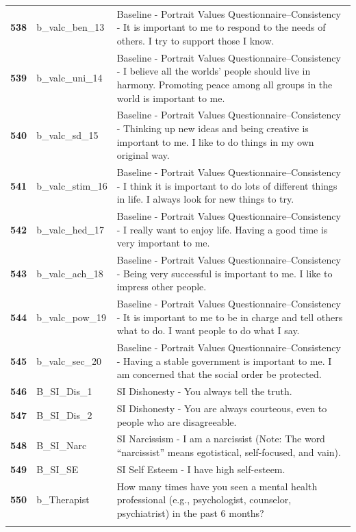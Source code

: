 \documentclass[
  letterpaper,
  DIV=11,
  numbers=noendperiod]{scrartcl}
\begin{document}
\begin{longtable}[t]{>{}cll}
\textbf{538} & b\_valc\_ben\_13 & Baseline - Portrait Values Questionnaire--Consistency - It is important to me to respond to the needs of others. I try to support those I know.\\
\textbf{539} & b\_valc\_uni\_14 & Baseline - Portrait Values Questionnaire--Consistency - I believe all the worlds' people should live in harmony. Promoting peace among all groups in the world is important to me.\\
\textbf{540} & b\_valc\_sd\_15 & Baseline - Portrait Values Questionnaire--Consistency - Thinking up new ideas and being creative is important to me. I like to do things in my own original way.\\
\addlinespace
\textbf{541} & b\_valc\_stim\_16 & Baseline - Portrait Values Questionnaire--Consistency - I think it is important to do lots of different things in life. I always look for new things to try.\\
\textbf{542} & b\_valc\_hed\_17 & Baseline - Portrait Values Questionnaire--Consistency - I really want to enjoy life. Having a good time is very important to me.\\
\textbf{543} & b\_valc\_ach\_18 & Baseline - Portrait Values Questionnaire--Consistency - Being very successful is important to me. I like to impress other people.\\
\textbf{544} & b\_valc\_pow\_19 & Baseline - Portrait Values Questionnaire--Consistency - It is important to me to be in charge and tell others what to do. I want people to do what I say.\\
\textbf{545} & b\_valc\_sec\_20 & Baseline - Portrait Values Questionnaire--Consistency - Having a stable government is important to me. I am concerned that the social order be protected.\\
\addlinespace
\textbf{546} & B\_SI\_Dis\_1 & SI Dishonesty - You always tell the truth.\\
\textbf{547} & B\_SI\_Dis\_2 & SI Dishonesty - You are always courteous, even to people who are disagreeable.\\
\textbf{548} & B\_SI\_Narc & SI Narcissism - I am a narcissist (Note: The word “narcissist” means egotistical, self-focused, and vain).\\
\textbf{549} & B\_SI\_SE & SI Self Esteem - I have high self-esteem.\\
\textbf{550} & b\_Therapist & How many times have you seen a mental health professional (e.g., psychologist, counselor, psychiatrist) in the past 6 months?\\
\addlinespace

\end{longtable}
\end{document}

